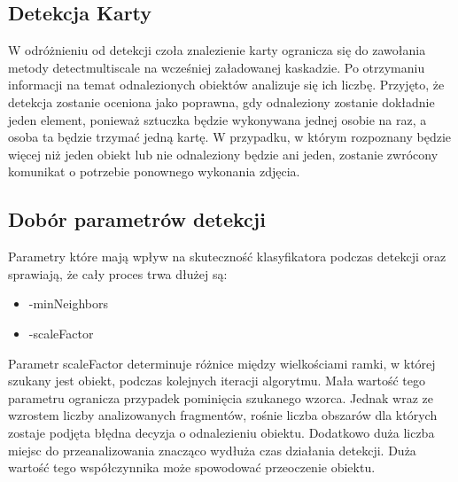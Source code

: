 \subsection{Detekcja Karty}

W odróżnieniu od detekcji czoła znalezienie karty ogranicza się do zawołania metody detectmultiscale na wcześniej załadowanej kaskadzie. Po otrzymaniu informacji na temat odnalezionych obiektów analizuje się ich liczbę. Przyjęto, że detekcja zostanie oceniona jako poprawna, gdy odnaleziony zostanie dokładnie jeden element, ponieważ sztuczka będzie wykonywana jednej osobie na raz, a osoba ta będzie trzymać jedną kartę. W przypadku, w którym rozpoznany będzie więcej niż jeden obiekt lub nie odnaleziony będzie ani jeden, zostanie zwrócony komunikat o potrzebie ponownego wykonania zdjęcia.

\subsection{Dobór parametrów detekcji}

Parametry które mają wpływ na skuteczność klasyfikatora podczas detekcji oraz sprawiają, że cały proces trwa dłużej są:
\begin{itemize}
    \item -minNeighbors
    \item -scaleFactor
\end{itemize}

Parametr scaleFactor determinuje różnice między wielkościami ramki, w której szukany jest obiekt, podczas kolejnych iteracji algorytmu. Mała wartość tego parametru ogranicza przypadek pominięcia szukanego wzorca. Jednak wraz ze wzrostem liczby analizowanych fragmentów, rośnie liczba obszarów dla których zostaje podjęta błędna decyzja o odnalezieniu obiektu. Dodatkowo duża liczba miejsc do przeanalizowania znacząco wydłuża czas działania detekcji. Duża wartość tego współczynnika może spowodować przeoczenie obiektu.


